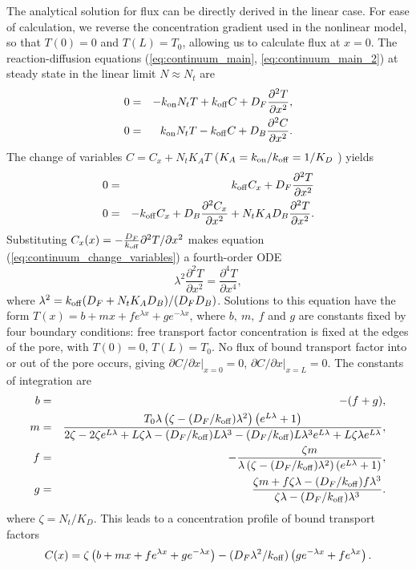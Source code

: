 The analytical solution for flux can be directly derived in the linear
case.  For ease of calculation, we reverse the concentration gradient
used in the nonlinear model, so that $T(0) = 0$ and $T(L) = T_0$, allowing
us to calculate flux at $x=0$.  The reaction-diffusion equations
(\ref{eq:continuum_main}, \ref{eq:continuum_main_2}) at steady state
in the linear limit $N \approx N_t$ are
\begin{eqnarray}
0 &=& -k_{\rm on} N_t T +k_{\rm off} C +D_F\frac{\partial^2 T}{\partial x^2},  \\ 
0 &=& k_{\rm on} N_tT -k_{\rm off} C + D_B \frac{\partial^2 C}{\partial x^2} .
\label{eq:continuum_linear} 
\end{eqnarray}
The change of variables $C = C_x + N_t K_A T$ ($K_A =  k_{\rm on} / k_{\rm off}  = 1/K_D $ ) yields
\begin{eqnarray}
  0 &=& k_{\rm off} C_x +D_F\frac{\partial^2 T}{\partial x^2}   \\ 
  0 &=& -k_{\rm off} C_x  + D_B \frac{\partial^2 C_x}{\partial x^2} + N_t
        K_A  D_B \frac{\partial^2 T}{\partial x^2}.
\label{eq:continuum_change_variables} 
\end{eqnarray}
Substituting $C_x(x) = -\frac{D_F}{k_{\rm off}}\partial^2T/\partial x^2$
makes equation (\ref{eq:continuum_change_variables}) a fourth-order
ODE
\begin{equation}
  \lambda^2 \frac{\partial^2 T}{\partial x^2} =  \frac{\partial^4
    T}{\partial x^4}, 
\label{continuum} 
\end{equation} 
where $\lambda^2 = k_{\rm off}(D_F+ N_t K_A D_B)/(D_FD_B)$.  Solutions to
this equation have the form
$T(x) = b + m x + f e^{\lambda x} + g e^{-\lambda x}$, where
$b,\ m,\ f$ and $g$ are constants fixed by four boundary conditions:
free transport factor concentration is fixed at the edges of the pore, with
$T(0) = 0 $, $T(L)=T_0$. No flux of bound transport factor into or out of the pore
occurs, giving $\partial C/\partial x |_{x=0} =0$,
$\partial C/\partial x|_{x=L} = 0$.  The constants of integration are
\begin{eqnarray}
b&=& - (f+g),\\
m & =& \frac{T_0\lambda \left( \zeta -(D_F/k_{\rm off}) {\lambda}^2\right) \left(e^{L \lambda} + 1\right)}{2  \zeta - 2  \zeta e^{L \lambda} + L  \zeta \lambda -(D_F/k_{\rm off}) L {\lambda}^3 -(D_F/k_{\rm off}) L {\lambda}^3 e^{L \lambda} + L  \zeta \lambda e^{L \lambda}},\\
f &=& -\frac{ \zeta m}{\lambda \left( \zeta -(D_F/k_{\rm off}) {\lambda}^2\right) \left(e^{L \lambda} + 1\right)},\\
g &=& \frac{ \zeta m + f  \zeta \lambda- (D_F/k_{\rm off}) f {\lambda}^3 }{ \zeta \lambda -(D_F/k_{\rm off}) {\lambda}^3}.
\end{eqnarray}
where $\zeta = N_t/K_D$. This leads to a concentration profile of bound transport factors 
\begin{equation}
C(x) = \zeta \left(b + m x + f e^{\lambda x} + g e^{- \lambda
    x}\right) - (D_F{\lambda}^2/k_{\rm off})   \left(ge^{- \lambda x} + f
  e^{ \lambda x}\right). 
\end{equation}

